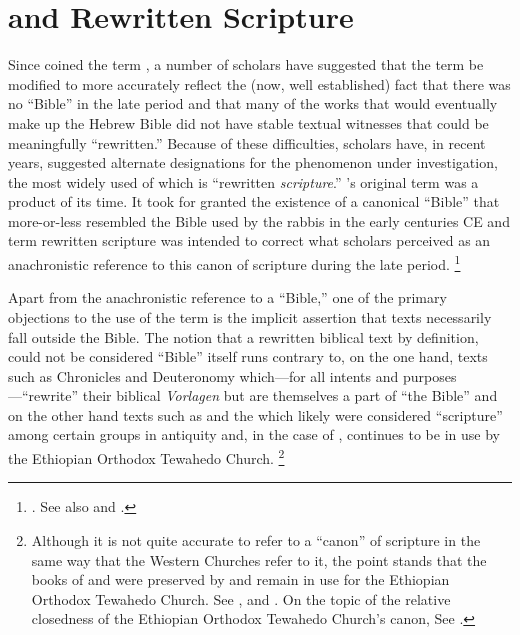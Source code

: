 
\section{\RWB and Rewritten Scripture}

Since \vermes coined the term \rwb, a number of scholars have suggested that the term be modified to more accurately reflect the (now, well established) fact that there was no ``Bible'' in the late \secondtemple period and that many of the works that would eventually make up the Hebrew Bible did not have stable textual witnesses that could be meaningfully ``rewritten.'' Because of these difficulties, scholars have, in recent years, suggested alternate designations for the phenomenon under investigation, the most widely used of which is ``rewritten \emph{scripture}.'' \vermes's original term \rwb was a product of its time. It took for granted the existence of a canonical ``Bible'' that more-or-less resembled the Bible used by the rabbis in the early centuries CE and term rewritten scripture was intended to correct what scholars perceived as an anachronistic reference to this canon of scripture during the late \secondtemple period.%
    \footnote{%
        \cite[58--59]{campbell_zsengeller2014}. See also
        \cite{ulrich_mcdonald-sanders2002} and 
        \cite{ulrich_zsengeller2014}.}

Apart from the anachronistic reference to a ``Bible,'' one of the primary objections to the use of the term \rwb is the implicit assertion that \rwb texts necessarily fall outside the Bible.%
    \autocite[61]{campbell_zsengeller2014}
The notion that a rewritten biblical text by definition, could not be considered ``Bible'' itself runs contrary to, on the one hand, texts such as Chronicles and Deuteronomy which---for all intents and purposes---``rewrite'' their biblical \emph{Vorlagen} but are themselves a part of ``the Bible'' and on the other hand texts such as \jub and the \templescroll which likely were considered ``scripture'' among certain groups in antiquity and, in the case of \jub, continues to be in use by the Ethiopian Orthodox Tewahedo Church.%
    \footnote{Although it is not quite accurate to refer to a ``canon'' of scripture in the same way that the Western Churches refer to it, the point stands that the books of \enoch and \jub were preserved by and remain in use for the Ethiopian Orthodox Tewahedo Church. See \cite{baynes_mason-etal2012}, \cite{asale_js2013} and \cite{cowley_os1974}. On the topic of the relative closedness of the Ethiopian Orthodox Tewahedo Church's canon, See \cite{asale_bt2016}.}


